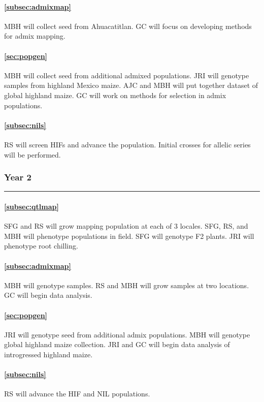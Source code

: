 \paragraph{  \bf  \ref{subsec:admixmap}} MBH will collect seed from Ahuacatitlan. GC will focus on developing methods for admix mapping.
\paragraph{  \bf  \ref{sec:popgen}} MBH will collect seed from additional admixed populations. JRI will genotype samples from highland Mexico maize. AJC and MBH will put together dataset of global highland maize. GC will work on methods for selection in admix populations.
\paragraph{ \bf \ref{subsec:nils}} RS will screen HIFs and advance the population. Initial crosses for allelic series will be performed.

\subsubsection*{Year 2} \hrule \vspace{0.1cm}

\paragraph{  \bf \ref{subsec:qtlmap}} SFG and RS will grow mapping population at each of 3 locales.  SFG, RS, and MBH will phenotype populations in field. SFG will genotype F2 plants. JRI will phenotype root chilling. 
\paragraph{  \bf  \ref{subsec:admixmap}} MBH will genotype samples.  RS and MBH will grow samples at two locations.  GC will begin data analysis.
\paragraph{  \bf  \ref{sec:popgen}} JRI will genotype seed from additional admix populations. MBH will genotype global highland maize collection. JRI and GC will begin data analysis of introgressed highland maize.
\paragraph{ \bf \ref{subsec:nils}} RS will advance the HIF and NIL populations.  
